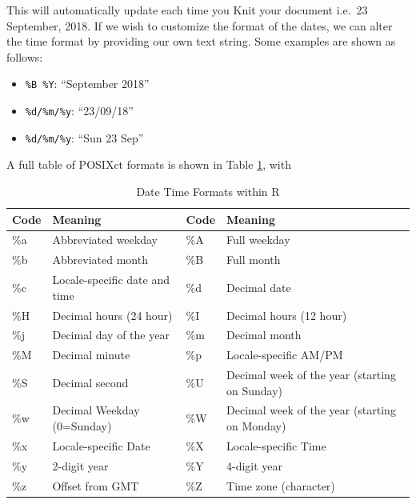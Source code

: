 \documentclass[]{book}
\newenvironment{Shaded}{\begin{snugshade}}{\end{snugshade}}
\newcommand{\OtherTok}[1]{\textcolor[rgb]{0.56,0.35,0.01}{#1}}
\newcommand{\FunctionTok}[1]{\textcolor[rgb]{0.00,0.00,0.00}{#1}}
\newcommand{\AttributeTok}[1]{\textcolor[rgb]{0.77,0.63,0.00}{#1}}
\providecommand{\tightlist}{%
  \setlength{\itemsep}{0pt}\setlength{\parskip}{0pt}}
\begin{document}
\begin{Shaded}
\end{Shaded}

This will automatically update each time you Knit your document i.e.~23
September, 2018. If we wish to customize the format of the dates, we can
alter the time format by providing our own text string. Some examples
are shown as follows:

\begin{itemize}
\tightlist
\item
  \texttt{\%B\ \%Y}: ``September 2018''
\item
  \texttt{\%d/\%m/\%y}: ``23/09/18''
\item
  \texttt{\%d/\%m/\%y}: ``Sun 23 Sep''
\end{itemize}

A full table of POSIXct formats is shown in Table
\ref{tab:dateTimeFormats}, with

\begin{table}

\caption{\label{tab:dateTimeFormats}Date Time Formats within R}
\centering
\begin{tabular}[t]{l|l|l|l}
\hline
Code & Meaning & Code & Meaning\\
\hline
\%a & Abbreviated weekday & \%A & Full weekday\\
\hline
\%b & Abbreviated month & \%B & Full month\\
\hline
\%c & Locale-specific date and time & \%d & Decimal date\\
\hline
\%H & Decimal hours (24 hour) & \%I & Decimal hours (12 hour)\\
\hline
\%j & Decimal day of the year & \%m & Decimal month\\
\hline
\%M & Decimal minute & \%p & Locale-specific AM/PM\\
\hline
\%S & Decimal second & \%U & Decimal week of the year (starting on Sunday)\\
\hline
\%w & Decimal Weekday (0=Sunday) & \%W & Decimal week of the year (starting on Monday)\\
\hline
\%x & Locale-specific Date & \%X & Locale-specific Time\\
\hline
\%y & 2-digit year & \%Y & 4-digit year\\
\hline
\%z & Offset from GMT & \%Z & Time zone (character)\\
\hline
\end{tabular}
\end{table}
\end{document}
